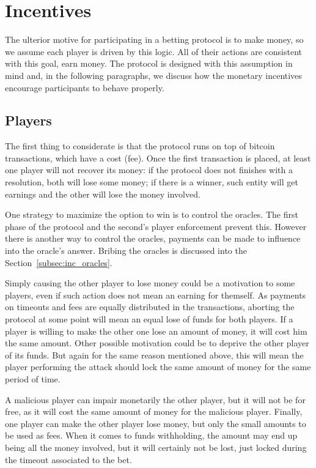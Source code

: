 \section{Incentives}

The ulterior motive for participating in a betting protocol is to make money, so
  we assume each player is driven by this logic.
All of their actions are consistent with this goal, earn money.
The protocol is designed with this assumption in mind and, in the following
  paragraphs, we discuss how the monetary incentives encourage participants to
  behave properly.

\subsection{Players}

The first thing to considerate is that the protocol runs on top of bitcoin
  transactions, which have a cost (fee).
Once the first transaction is placed, at least one player will not recover its
  money: if the protocol does not finishes with a resolution, both will lose
  some money; if there is a winner, such entity will get earnings and the other
  will lose the money involved.

One strategy to maximize the option to win is to control the oracles.
The first phase of the protocol and the second's player enforcement
  prevent this.
However there is another way to control the oracles, payments can be made to
  influence into the oracle's answer.
Bribing the oracles is discussed into the Section~\ref{subsec:inc_oracles}.

Simply causing the other player to lose money could be a motivation to some
  players, even if such action does not mean an earning for themself.
As payments on timeouts and fees are equally distributed in the transactions,
  aborting the protocol at some point will mean an equal lose of funds for both
  players. If a player is willing to make the other one lose an amount of money,
  it will cost him the same amount.
Other possible motivation could be to deprive the other player of its funds.
But again for the same reason mentioned above, this will mean the player
  performing the attack should lock the same amount of money for the same period
  of time.

A malicious player can impair monetarily the other player, but it will not be
  for free, as it will cost the same amount of money for the malicious player.
Finally, one player can make the other player lose money, but only the small
  amounts to be used as fees.
When it comes to funds withholding, the amount may end up being all the money
  involved, but it will certainly not be lost, just locked during the timeout
  associated to the bet.


